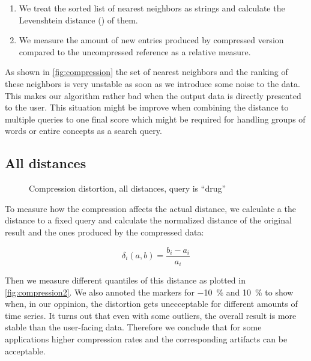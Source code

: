 \begin{enumerate}
    \item We treat the sorted list of nearest neighbors as strings and calculate the Levenshtein distance (\cite{levenshtein}) of them.
    \item We measure the amount of new entries produced by compressed version compared to the uncompressed reference as a relative measure.
\end{enumerate}

As shown in \autoref{fig:compression} the set of nearest neighbors and the ranking of these neighbors is very unstable as soon as we introduce some noise to the data. This makes our algorithm rather bad when the output data is directly presented to the user. This situation might be improve when combining the distance to multiple queries to one final score which might be required for handling groups of words or entire concepts as a search query.


\subsection{All distances}
\label{ssec:evaluation:distortion:dist}

\begin{figure}
    \centering
    
    \caption{Compression distortion, all distances, query is \enquote{drug}}
    \label{fig:compression2}
\end{figure}

To measure how the compression affects the actual distance, we calculate a the distance to a fixed query and calculate the normalized distance of the original result and the ones produced by the compressed data:

\begin{equation}
    \delta_i(a, b) = \frac{b_i - a_i}{a_i}
\end{equation}

Then we measure different quantiles of this distance as plotted in \autoref{fig:compression2}. We also annoted the markers for \SI{-10}{\percent} and \SI{10}{\percent} to show when, in our oppinion, the distortion gets unecceptable for different amounts of time series. It turns out that even with some outliers, the overall result is more stable than the user-facing data. Therefore we conclude that for some applications higher compression rates and the corresponding artifacts can be acceptable.



